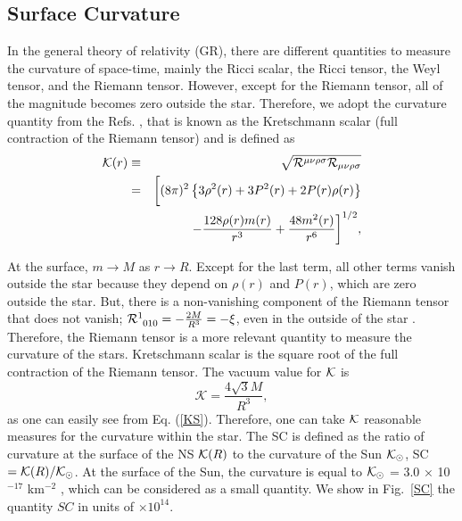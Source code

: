 \documentclass[%
reprint,
superscriptaddress,
nofootinbib,
amsmath,
amssymb,
aps,
floatfix,
showkeys,
]{revtex4-2}
\begin{document}
\subsection{Surface Curvature}
\label{sc}
In the general theory of relativity (GR), there are different quantities to measure the curvature of space-time, mainly the Ricci scalar, the Ricci tensor, the Weyl tensor, and the Riemann tensor. However, except for the Riemann tensor, all of the magnitude becomes zero outside the star. Therefore, we adopt the curvature quantity from the Refs. \cite{Kazim_2014, Das_2021}, that is known as the Kretschmann scalar (full contraction of the Riemann tensor) and is defined as 
\begin{eqnarray}
{\cal{K}}(r)&\equiv&\sqrt{{\cal{R}}^{\mu\nu\rho\sigma}{\cal{R}}_{\mu\nu\rho\sigma}}
\nonumber\\
&=& \bigg[(8\pi)^2\left \{3{\rho}^2(r)+3P^2(r)+2P(r){\rho}(r)\right\}
\nonumber\\
&&
-\frac{128{\rho}(r)m(r)}{r^3} +\frac{48m^2(r)}{r^6}\bigg]^{1/2},
\label{KS}
\end{eqnarray}

At the surface, $m\rightarrow M$ as $r \rightarrow R$. Except for the last term, all other terms vanish outside the star because they depend on ${\rho}(r)$ and $P(r)$, which are zero outside the star. But, there is a non-vanishing component of the Riemann tensor that does not vanish; $\tensor{{\cal R}}{^1_{010}}=-\frac{2M}{R^3}=- \xi$, even in the outside of the star \cite{Kazim_2014, Xiao_2015}. Therefore, the Riemann tensor is a more relevant quantity to measure the curvature of the stars. Kretschmann scalar is the square root of the full contraction of the Riemann tensor. The vacuum value for $\cal{K}$ is
\begin{equation}
 \mathcal{K} =  \frac{4\sqrt{3} M}{R^3},
\end{equation}
as one can easily see from Eq. (\ref{KS}). Therefore, one can take $\cal K$ reasonable measures for the curvature within the star. The SC is defined as the ratio of curvature at the surface of the NS ${\cal{K}}(R)$ to the curvature of the Sun ${\cal{K}}_\odot$, SC $={\cal{K}}(R)/{\cal{K}}_\odot$. At the surface of the
Sun, the curvature is equal to $\cal{K}_\odot$ = 3.0 × 10$^{-17}$ km$^{-2}$ , which
can be considered as a small quantity. We show in Fig.~\ref{SC} the quantity $SC$ in units of $\times 10^{14}$.
\end{document}

